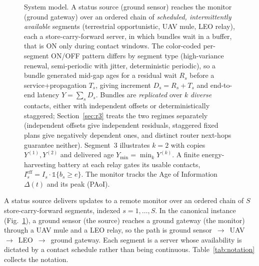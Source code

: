\documentclass[twocolumn,3p,times,procedia]{elsarticle}
\theoremstyle{plain}
\theoremstyle{remark}
\begin{document}
\begin{figure}[t]
{}
\caption{System model. A status source (ground sensor) reaches the
monitor (ground gateway) over an ordered chain of \emph{scheduled,
intermittently available} segments (terrestrial opportunistic, UAV
mule, LEO relay), each a store-carry-forward server, in which bundles
wait in a buffer, that is ON only during contact windows. The color-coded
per-segment ON/OFF pattern differs by segment type (high-variance renewal,
semi-periodic with jitter, deterministic periodic), so a bundle generated
mid-gap ages for a residual wait $R_s$ before a service+propagation
$T_s$, giving increment $D_s=R_s+T_s$ and end-to-end latency
$Y=\sum_s D_s$. Bundles are \emph{replicated} over $k$ \emph{diverse}
contacts, either with independent offsets or deterministically
staggered; Section~\ref{sec:r3} treats the two regimes separately
(independent offsets give independent residuals, staggered fixed plans
give negatively dependent ones, and distinct router next-hops guarantee
neither). Segment~3 illustrates $k{=}2$ with
copies $Y^{(1)},Y^{(2)}$ and delivered age $Y_{\min}=\min_k Y^{(k)}$. A
finite energy-harvesting battery at each relay gates its usable contacts,
$I^{\mathrm{eff}}_s=I_s\cdot\mathbb{1}\{b_s\ge e\}$.
The monitor tracks the Age of Information $\Delta(t)$ and its peak (PAoI).}
\label{fig:model}
\end{figure}

A status source delivers updates to a remote monitor over an ordered
chain of $S$ store-carry-forward segments, indexed $s=1,\dots,S$. In the
canonical instance (Fig.~\ref{fig:model}), a ground sensor (the
source) reaches a ground gateway (the monitor) through a UAV mule and a
LEO relay, so the path is ground
sensor~$\to$~UAV~$\to$~LEO~$\to$~ground gateway. Each segment is a server
whose availability is dictated by a contact schedule rather than being
continuous. Table~\ref{tab:notation} collects the notation.
\end{document}
